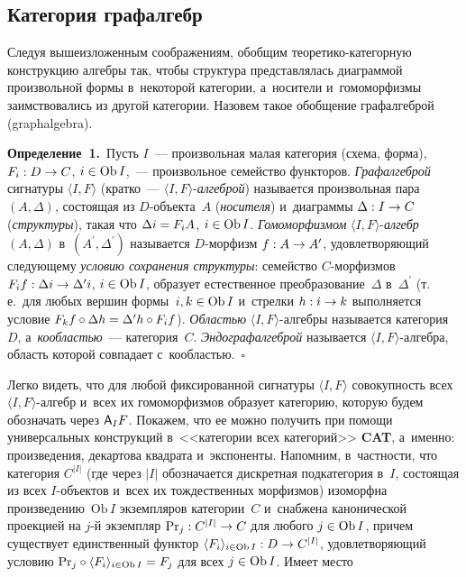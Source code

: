 \begin{multicols}{2}
\section{Категория графалгебр}

  Следуя вышеизложенным соображениям, обобщим тео\-ре\-ти\-ко-ка\-те\-гор\-ную 
конструкцию ал\-геб\-ры так, чтобы структура пред\-став\-ля\-лась диаграммой 
произвольной формы в~некоторой категории, а~носители и~гомоморфизмы 
заимствовались из другой категории. Назовем такое обоб\-ще\-ние графалгеброй 
(graphalgebra).
  
  \smallskip
  
  \noindent
  \textbf{Определение~1.}\ Пусть $I$~--- произвольная малая категория 
(схема, форма), $F_i : D \hm\to  C$, $i \hm\in \mathrm{Ob}\,I$,~--- произвольное 
семейство функторов. \textit{Графалгеброй} сигнатуры $\langle I, F\rangle$ 
(кратко~--- $\langle I, F\rangle$-\textit{ал\-геб\-рой}) называется произвольная 
пара $(A, \Delta)$, со\-сто\-ящая из \mbox{$D$-объ}\-екта~$A$ (\textit{носителя}) 
и~диа\-грам\-мы $\Delta : I \hm \to C$ (\textit{структуры}), такая что $\Delta i \hm= 
F_iA$, $i\hm\in \mathrm{Ob}\,I$. \textit{Гомоморфизмом} $\langle I,  
F\rangle$-\textit{ал\-гебр} $(A, \Delta)$ в~$(A^\prime, \Delta^\prime)$ называется 
$D$-мор\-физм $f : A \hm\to A^\prime$, удовле\-тво\-ря\-ющий сле\-ду\-юще\-му \textit{условию 
сохранения структуры}: семейство $C$-мор\-физ\-мов $F_if : \Delta i \hm\to 
\Delta^\prime i$, $i \hm\in \mathrm{Ob}\,I$, образует естественное 
преобразование~$\Delta$ в~$\Delta^\prime$ (т.\,е.\ для любых вершин 
формы~$i, k \hm\in\mathrm{Ob}\, I$ и~стрелки $h : i \hm\to k$ выполняется 
условие $F_kf \circ \Delta h \hm= \Delta^\prime h \circ F_if$). \textit{Областью}
  $\langle I, F\rangle$-ал\-геб\-ры называется категория~$D$, 
а~\textit{ко\-об\-ластью}~--- категория~$C$. \textit{Эндографалгеброй} называется 
$\langle I, F\rangle$-ал\-геб\-ра, об\-ласть которой совпадает 
с~ко\-об\-ластью.~$\square$
  
  Легко видеть, что для любой фиксированной сигнатуры $\langle I, F\rangle$ 
со\-во\-куп\-ность всех $\langle I, F\rangle$-ал\-гебр и~всех их гомоморфизмов 
образует категорию, которую будем обозначать через ${\sf A}_IF$. Покажем, 
что ее можно получить при помощи универсальных конструкций 
в~<<категории всех категорий>> \textbf{CAT}, а~именно: произведения, 
декартова квад\-ра\-та и~экспоненты. Напомним, в~част\-ности, что категория $C^{\vert I\vert}$ 
(где через $\vert I\vert$ обозначается дис\-крет\-ная подкатегория в~$I$, со\-сто\-ящая 
из всех $I$-объ\-ек\-тов и~всех их тож\-дест\-вен\-ных морфизмов) изоморфна 
произведению~$\mathrm{Ob}\,I$ экземпляров категории~$C$ и~снаб\-же\-на 
канонической проекцией на $j$-й экземпляр $\mathrm{Pr}_j : C^{\vert I\vert} \hm\to C$ 
для любого $j\hm\in \mathrm{Ob}\,I$, причем существует единственный 
функтор $\langle F_i\rangle_{i\in \mathrm{Ob}\,I} : D\hm\to C^{\vert I\vert}$, 
удовле\-тво\-ря\-ющий условию $\mathrm{Pr}_j\circ \langle F_i\rangle_{i\in 
\mathrm{Ob}\,I}\hm= F_j$  для всех $j\hm \in \mathrm{Ob}\,I$. Имеет \mbox{место}
  

\end{multicols}
